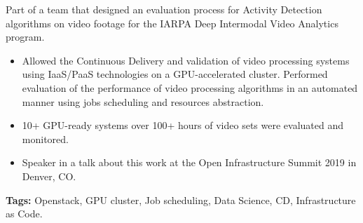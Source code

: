 \documentclass[10pt,a4paper,ragged2e]{altacv}
\begin{document}

\begin{fullwidth}
\makecvheader
\end{fullwidth}





 \hfill
{}\hspace{5em}\vspace{0.3em}\vspace{0.3em}\break
Part of a team that designed an evaluation process for Activity Detection algorithms on video footage for the IARPA Deep Intermodal Video Analytics program.
\begin{itemize}

\item Allowed the Continuous Delivery and validation of video processing systems using IaaS/PaaS technologies on a GPU-accelerated cluster. Performed evaluation of the performance of video processing algorithms in an automated manner using jobs scheduling and resources abstraction.
\item 10+ GPU-ready systems over 100+ hours of video sets were evaluated and monitored.
\item Speaker in a talk about this work at the Open Infrastructure Summit 2019 in Denver, CO.
\end{itemize}
\textbf{\color{accent}Tags:} Openstack, GPU cluster, Job scheduling, Data Science, CD, Infrastructure as Code.
\end{document}
